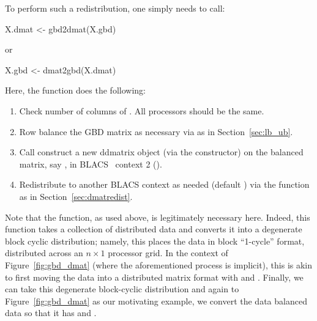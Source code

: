 To perform such a redistribution, one simply needs to call:~
\begin{Code}[title=R Code]
X.dmat <- gbd2dmat(X.gbd)
\end{Code}
or
\begin{Code}[title=R Code]
X.gbd <- dmat2gbd(X.dmat)
\end{Code}
Here, the  function does the following:
\begin{enumerate}
\item Check number of columns of .  All
      processors should be the same.
\item Row balance the GBD matrix as necessary via  as in Section~\ref{sec:lb_ub}.
\item Call construct a new ddmatrix object (via the  constructor) on the balanced matrix,
      say , in BLACS~ context 2 ().
\item Redistribute  to another BLACS context as needed 
      (default ) via the  function as in Section~\ref{sec:dmatredist}.
\end{enumerate}
Note that the  function, as used above, is legitimately necessary here.  Indeed, this function takes a collection of distributed data and converts it into a degenerate block cyclic distribution; namely, this places the data in block ``1-cycle'' format, distributed across an $n\times 1$ processor grid.  In the context of Figure~\ref{fig:gbd_dmat} (where the aforementioned process is implicit), this is akin to first moving the data into a distributed matrix format with  and .  Finally, we can take this degenerate block-cyclic distribution and again to Figure~\ref{fig:gbd_dmat} as our motivating example, we convert the data balanced data so that it has  and .

